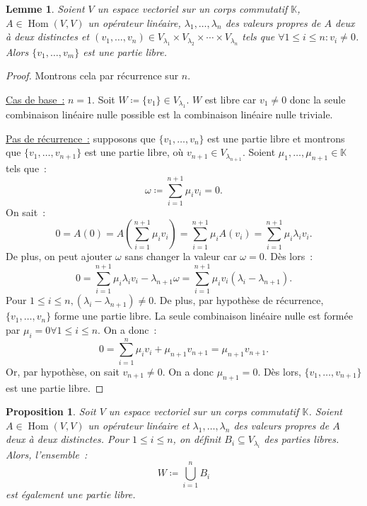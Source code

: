 \documentclass{article}
\DeclareMathOperator{\Hom}{Hom}
\newcommand{\K}{\mathbb K}
\newtheorem{prp}[thm]{Proposition}
\newtheorem{lem}[thm]{Lemme}
\theoremstyle{definition}
\theoremstyle{remark}
\begin{document}
		\begin{lem}\label{combiliSousEspacesPropresLibre} Soient $V$ un espace vectoriel sur un corps commutatif $\K$, $A \in \Hom(V, V)$ un opérateur linéaire,
		$\lambda_1, \dotsc, \lambda_n$ des valeurs propres de $A$ deux à deux distinctes et
		$(v_1, \dotsc, v_n) \in V_{\lambda_1} \times V_{\lambda_2} \times \dotsb \times V_{\lambda_n}$ tels que $\forall 1 \leq i \leq n : v_i \neq 0$. Alors
		$\{v_1, \dotsc, v_m\}$ est une partie libre. \end{lem}

		\begin{proof} Montrons cela par récurrence sur $n$.

		\underline{Cas de base~:} $n = 1$. Soit $W \coloneqq \{v_1\} \in V_{\lambda_1}$. $W$ est libre car $v_1 \neq 0$ donc la seule combinaison linéaire nulle
		possible est la combinaison linéaire nulle triviale.

		\underline{Pas de récurrence~:} supposons que $\{v_1, \dotsc, v_n\}$ est une partie libre et montrons que $\{v_1, \dotsc, v_{n+1}\}$ est une partie libre,
		où $v_{n+1} \in V_{\lambda_{n+1}}$. Soient $\mu_1, \dotsc, \mu_{n+1} \in \K$ tels que~: \[\omega \coloneqq \sum_{i=1}^{n+1}\mu_iv_i = 0.\]
		On sait~: \[0 = A(0) = A\left(\sum_{i=1}^{n+1}\mu_iv_i\right) = \sum_{i=1}^{n+1}\mu_i A(v_i) = \sum_{i=1}^{n+1}\mu_i\lambda_iv_i.\]
		De plus, on peut ajouter $\omega$ sans changer la valeur car $\omega = 0$. Dès lors~:
		\[0 = \sum_{i=1}^{n+1}\mu_i\lambda_iv_i - \lambda_{n+1}\omega = \sum_{i=1}^{n+1}\mu_iv_i(\lambda_i - \lambda_{n+1}).\]
		Pour $1 \leq i \leq n, (\lambda_i - \lambda_{n+1}) \neq 0$. De plus, par hypothèse de récurrence, $\{v_1, \dotsc, v_n\}$ forme une partie libre. La seule
		combinaison linéaire nulle est formée par $\mu_i = 0 \forall 1 \leq i \leq n$. On a donc~: \[0 = \sum_{i=1}^{n}\mu_iv_i + \mu_{n+1}v_{n+1} = \mu_{n+1}v_{n+1}.\]
		Or, par hypothèse, on sait $v_{n+1} \neq 0$. On a donc $\mu_{n+1} = 0$. Dès lors, $\{v_1, \dotsc, v_{n+1}\}$ est une partie libre. \end{proof}

		\begin{prp}\label{unionVlambdaLibre} Soit $V$ un espace vectoriel sur un corps commutatif $\K$. Soient $A \in \Hom(V, V)$ un opérateur linéaire et
		$\lambda_1, \dotsc, \lambda_n$ des valeurs propres de $A$ deux à deux distinctes. Pour $1 \leq i \leq n$, on définit $B_i \subseteq V_{\lambda_i}$ des parties
		libres. Alors, l'ensemble~: \[W \coloneqq \bigcup_{i=1}^nB_i\] est également une partie libre. \end{prp}
\end{document}
